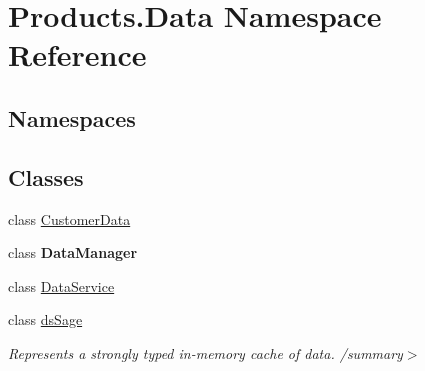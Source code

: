 \hypertarget{namespace_products_1_1_data}{}\section{Products.\+Data Namespace Reference}
\label{namespace_products_1_1_data}
\subsection*{Namespaces}
\begin{DoxyCompactItemize}
\end{DoxyCompactItemize}
\subsection*{Classes}
\begin{DoxyCompactItemize}
\item 
class \hyperlink{class_products_1_1_data_1_1_customer_data}{Customer\+Data}
\item 
class {\bfseries Data\+Manager}
\item 
class \hyperlink{class_products_1_1_data_1_1_data_service}{Data\+Service}
\item 
class \hyperlink{class_products_1_1_data_1_1ds_sage}{ds\+Sage}
\begin{DoxyCompactList}\small\item\em Represents a strongly typed in-\/memory cache of data. /summary$>$ \end{DoxyCompactList}\end{DoxyCompactItemize}
